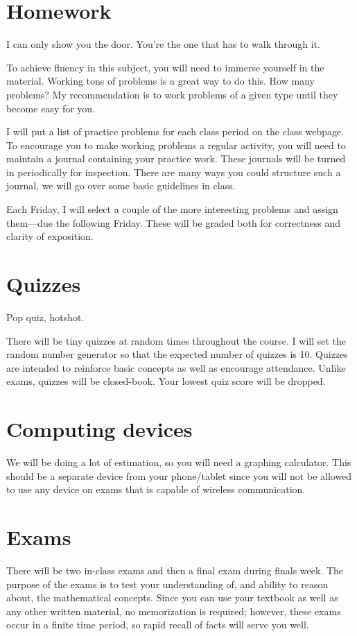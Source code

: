 \documentclass[12pt]{article}
\begin{document}
\section*{Homework} 
\epigraph{I can only show you the door. You're the one that has to walk through it.}{}
To achieve fluency in this subject, you will need to immerse yourself in the material.  
Working tons of problems is a great way to do this.  How many problems?  
My recommendation is to work problems of a given type until they become easy for you.

I will put a list of practice problems for each class period on the class webpage. 
To encourage you to make working problems a regular activity, you will need to maintain a journal containing your practice work.
These journals will be turned in periodically for inspection.  There are many ways you could structure such a journal, we will go over some
basic guidelines in class.

Each Friday, I will select a couple of the more interesting problems and assign them---due the following Friday.
These will be graded both for correctness and clarity of exposition.
\newpage
\section*{Quizzes}
\epigraph{Pop quiz, hotshot.}{}
There will be tiny quizzes at random times throughout the course.  I will set the random number generator so that the expected number of quizzes is 10.
Quizzes are intended to reinforce basic concepts as well as encourage attendance.
Unlike exams, quizzes will be closed-book.  Your lowest quiz score will be dropped.

\section*{Computing devices}
We will be doing a lot of estimation, so you will need a graphing calculator.  This should be a separate device from your phone/tablet since you will not be allowed to use any device on exams that is capable of wireless communication.

\section*{Exams}
There will be two in-class exams and then a final exam during finals week. 
The purpose of the exams is to test your understanding of, and ability to reason about, the mathematical concepts. Since you can use your textbook as well as any other written material, no memorization is required; however, these exams occur in a finite time period, so rapid recall of facts will serve you well. 
\end{document}
